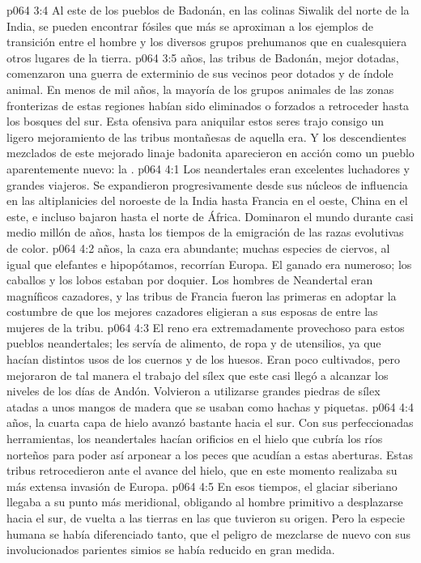 \vs p064 3:4 Al este de los pueblos de Badonán, en las colinas Siwalik del norte de la India, se pueden encontrar fósiles que más se aproximan a los ejemplos de transición entre el hombre y los diversos grupos prehumanos que en cualesquiera otros lugares de la tierra.
\vs p064 3:5 \pc {} años, las tribus de Badonán, mejor dotadas, comenzaron una guerra de exterminio de sus vecinos peor dotados y de índole animal. En menos de mil años, la mayoría de los grupos animales de las zonas fronterizas de estas regiones habían sido eliminados o forzados a retroceder hasta los bosques del sur. Esta ofensiva para aniquilar estos seres trajo consigo un ligero mejoramiento de las tribus montañesas de aquella era. Y los descendientes mezclados de este mejorado linaje badonita aparecieron en acción como un pueblo aparentemente nuevo: la .
\vs p064 4:1 Los neandertales eran excelentes luchadores y grandes viajeros. Se expandieron progresivamente desde sus núcleos de influencia en las altiplanicies del noroeste de la India hasta Francia en el oeste, China en el este, e incluso bajaron hasta el norte de África. Dominaron el mundo durante casi medio millón de años, hasta los tiempos de la emigración de las razas evolutivas de color.
\vs p064 4:2 \pc {} años, la caza era abundante; muchas especies de ciervos, al igual que elefantes e hipopótamos, recorrían Europa. El ganado era numeroso; los caballos y los lobos estaban por doquier. Los hombres de Neandertal eran magníficos cazadores, y las tribus de Francia fueron las primeras en adoptar la costumbre de que los mejores cazadores eligieran a sus esposas de entre las mujeres de la tribu.
\vs p064 4:3 El reno era extremadamente provechoso para estos pueblos neandertales; les servía de alimento, de ropa y de utensilios, ya que hacían distintos usos de los cuernos y de los huesos. Eran poco cultivados, pero mejoraron de tal manera el trabajo del sílex que este casi llegó a alcanzar los niveles de los días de Andón. Volvieron a utilizarse grandes piedras de sílex atadas a unos mangos de madera que se usaban como hachas y piquetas.
\vs p064 4:4 \pc {} años, la cuarta capa de hielo avanzó bastante hacia el sur. Con sus perfeccionadas herramientas, los neandertales hacían orificios en el hielo que cubría los ríos norteños para poder así arponear a los peces que acudían a estas aberturas. Estas tribus retrocedieron ante el avance del hielo, que en este momento realizaba su más extensa invasión de Europa.
\vs p064 4:5 En esos tiempos, el glaciar siberiano llegaba a su punto más meridional, obligando al hombre primitivo a desplazarse hacia el sur, de vuelta a las tierras en las que tuvieron su origen. Pero la especie humana se había diferenciado tanto, que el peligro de mezclarse de nuevo con sus involucionados parientes simios se había reducido en gran medida.
